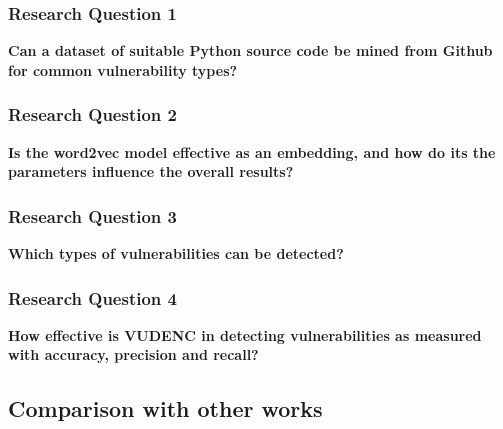 \documentclass[
	a4paper,
	pagesize,
	pdftex,
	12pt,
	twoside, %
	BCOR=5mm, %
	ngerman,
	fleqn,
	final,
	]{scrartcl}
\begin{document}
\subsubsection{Research Question 1}
\textbf{Can a dataset of suitable Python source code be mined from Github for common vulnerability types?}


\subsubsection{Research Question 2}
\textbf{Is the word2vec model effective as an embedding, and how do its the parameters influence the overall results?}

\subsubsection{Research Question 3}
\textbf{Which types of vulnerabilities can be detected?}

\subsubsection{Research Question 4}
\textbf{How effective is VUDENC in detecting vulnerabilities as measured with accuracy, precision and recall? }


\subsection{Comparison with other works}
\end{document}
